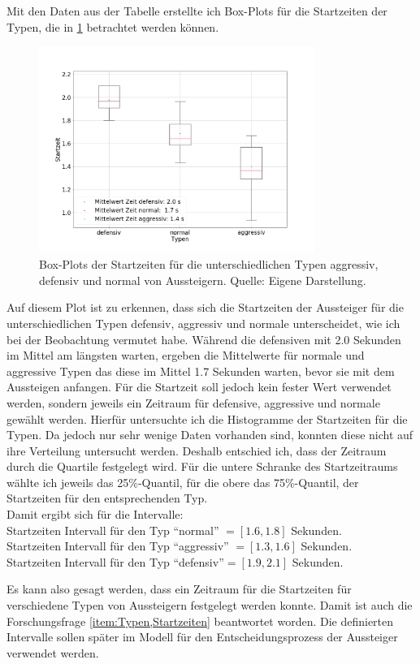 Mit den Daten aus der Tabelle erstellte ich Box-Plots für die Startzeiten der Typen, die in \figurename \ref{fig:BoxPlotStartingTime} betrachtet werden können.
\begin{figure}[H]
	\centering
		\includegraphics[width=0.8\textwidth]{pictures/data_evaluation/types/starting_time/starting_times.png}
	\caption{Box-Plots der Startzeiten für die unterschiedlichen Typen aggressiv, defensiv und normal von Aussteigern. Quelle: Eigene Darstellung.}
	\label{fig:BoxPlotStartingTime}
\end{figure}
Auf diesem Plot ist zu erkennen, dass sich die Startzeiten der Aussteiger für die unterschiedlichen Typen defensiv, aggressiv und normale unterscheidet, wie ich bei der Beobachtung vermutet habe. Während die defensiven mit 2.0 Sekunden im Mittel am längsten warten, ergeben die Mittelwerte für normale und aggressive Typen das diese im Mittel 1.7  Sekunden warten, bevor sie mit dem Aussteigen anfangen. Für die Startzeit soll jedoch kein fester Wert verwendet werden, sondern jeweils ein Zeitraum für defensive, aggressive und normale gewählt werden. Hierfür untersuchte ich die Histogramme der Startzeiten für die Typen. Da jedoch nur sehr wenige Daten vorhanden sind, konnten diese nicht auf ihre Verteilung untersucht werden. Deshalb entschied ich, dass der Zeitraum durch die Quartile festgelegt wird. Für die untere Schranke des Startzeitraums wählte ich jeweils das 25\%-Quantil, für die obere das 75\%-Quantil, der Startzeiten für den entsprechenden Typ. \\ 
Damit ergibt sich für die Intervalle: \\
Startzeiten Intervall für den Typ "`normal"' $= [1.6, 1.8]$ Sekunden. \\
Startzeiten Intervall für den Typ "`aggressiv"' $= [1.3, 1.6]$ Sekunden. \\
Startzeiten Intervall für den Typ "`defensiv"'$= [1.9, 2.1]$ Sekunden. 

Es kann also gesagt werden, dass ein Zeitraum für die Startzeiten für verschiedene Typen von Aussteigern festgelegt werden konnte. Damit ist auch die Forschungsfrage \ref{item:Typen,Startzeiten} beantwortet worden. Die definierten Intervalle sollen später im Modell für den Entscheidungsprozess der Aussteiger verwendet werden.
